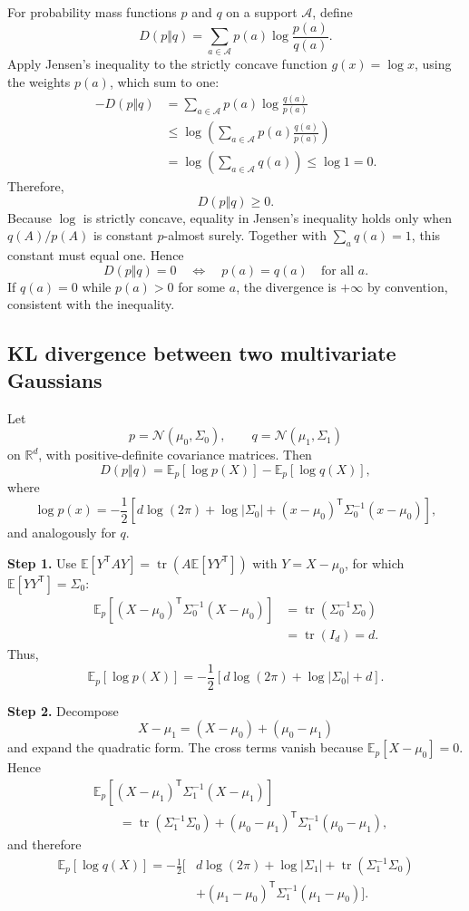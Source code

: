 \documentclass[11pt,letterpaper]{article}
\newcommand{\E}{\mathbb{E}}
\begin{document}
For probability mass functions $p$ and $q$ on a support $\mathcal A$, define
\[
  D(p\Vert q)
  =\sum_{a\in\mathcal A}p(a)
  \log\frac{p(a)}{q(a)}.
\]
Apply Jensen's inequality to the strictly concave function $g(x)=\log x$, using the weights $p(a)$, which sum to one:
\begin{align*}
  -D(p\Vert q)
  &=\sum_{a\in\mathcal A}p(a)
    \log\frac{q(a)}{p(a)}\\
  &\le
    \log\left(
      \sum_{a\in\mathcal A}p(a)\frac{q(a)}{p(a)}
    \right)\\
  &=\log\left(\sum_{a\in\mathcal A}q(a)\right)
  \le\log1=0.
\end{align*}
Therefore,
\[
  \boxed{D(p\Vert q)\ge0.}
\]
Because $\log$ is strictly concave, equality in Jensen's inequality holds only when $q(A)/p(A)$ is constant $p$-almost surely. Together with $\sum_a q(a)=1$, this constant must equal one. Hence
\[
  D(p\Vert q)=0
  \quad\Longleftrightarrow\quad
  p(a)=q(a)\quad\text{for all }a.
\]
If $q(a)=0$ while $p(a)>0$ for some $a$, the divergence is $+\infty$ by convention, consistent with the inequality.

\subsection*{KL divergence between two multivariate Gaussians}

Let
\[
  p=\mathcal N(\mu_0,\Sigma_0),
  \qquad
  q=\mathcal N(\mu_1,\Sigma_1)
\]
on $\mathbb R^d$, with positive-definite covariance matrices. Then
\[
  D(p\Vert q)=\E_p[\log p(X)]-\E_p[\log q(X)],
\]
where
\[
  \log p(x)
  =-\frac12\left[
    d\log(2\pi)+\log|\Sigma_0|
    +(x-\mu_0)^\mathsf T\Sigma_0^{-1}(x-\mu_0)
  \right],
\]
and analogously for $q$.

\textbf{Step 1.} Use $\E[Y^\mathsf TAY]=\operatorname{tr}(A\E[YY^\mathsf T])$ with $Y=X-\mu_0$, for which $\E[YY^\mathsf T]=\Sigma_0$:
\begin{align*}
\E_p\!\left[(X-\mu_0)^\mathsf T\Sigma_0^{-1}(X-\mu_0)\right]
&=\operatorname{tr}(\Sigma_0^{-1}\Sigma_0)\\
&=\operatorname{tr}(I_d)=d.
\end{align*}
Thus,
\[
  \E_p[\log p(X)]
  =-\frac12\left[d\log(2\pi)+\log|\Sigma_0|+d\right].
\]

\textbf{Step 2.} Decompose
\[
  X-\mu_1=(X-\mu_0)+(\mu_0-\mu_1)
\]
and expand the quadratic form. The cross terms vanish because $\E_p[X-\mu_0]=0$. Hence
\begin{align*}
&\E_p\!\left[(X-\mu_1)^\mathsf T\Sigma_1^{-1}(X-\mu_1)\right]\\
&\qquad=\operatorname{tr}(\Sigma_1^{-1}\Sigma_0)
 +(\mu_0-\mu_1)^\mathsf T\Sigma_1^{-1}(\mu_0-\mu_1),
\end{align*}
and therefore
\begin{align*}
\E_p[\log q(X)]
=-\frac12\bigl[&d\log(2\pi)+\log|\Sigma_1|
+\operatorname{tr}(\Sigma_1^{-1}\Sigma_0)\\
&+(\mu_1-\mu_0)^\mathsf T\Sigma_1^{-1}(\mu_1-\mu_0)
\bigr].
\end{align*}
\end{document}
